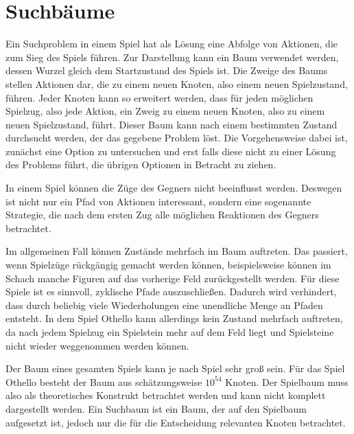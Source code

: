 \section{Suchbäume}

Ein Suchproblem in einem Spiel hat als Lösung eine Abfolge von Aktionen, die zum Sieg des Spiels führen.
Zur Darstellung kann ein Baum verwendet werden, dessen Wurzel gleich dem Startzustand des Spiels ist.
Die Zweige des Baums stellen Aktionen dar, die zu einem neuen Knoten, also einem neuen Spielzustand, führen.
Jeder Knoten kann so erweitert werden, dass für jeden möglichen Spielzug, also jede Aktion, ein Zweig zu einem neuen Knoten, also zu einem neuen Spielzustand, führt.
Dieser Baum kann nach einem bestimmten Zustand durchsucht werden, der das gegebene Problem löst.
Die Vorgehensweise dabei ist, zunächst eine Option zu untersuchen und erst falls diese nicht zu einer Lösung des Problems führt, die übrigen Optionen in Betracht zu ziehen.
\cite[S.~75]{ai2010russel}

In einem Spiel können die Züge des Gegners nicht beeinflusst werden.
Deswegen ist nicht nur ein Pfad von Aktionen interessant, sondern eine sogenannte Strategie, die nach dem ersten Zug alle möglichen Reaktionen des Gegners betrachtet.
\cite[S.~163]{ai2010russel}

Im allgemeinen Fall können Zustände mehrfach im Baum auftreten.
Das passiert, wenn Spielzüge rückgängig gemacht werden können, beispielsweise können im Schach manche Figuren auf das vorherige Feld zurückgestellt werden.
Für diese Spiele ist es sinnvoll, zyklische Pfade auszuschließen. %
Dadurch wird verhindert, dass durch beliebig viele Wiederholungen eine unendliche Menge an Pfaden entsteht.
\cite[S.~75]{ai2010russel}
In dem Spiel Othello kann allerdings kein Zustand mehrfach auftreten, da nach jedem Spielzug ein Spielstein mehr auf dem Feld liegt und Spielsteine nicht wieder weggenommen werden können.

Der Baum eines gesamten Spiels kann je nach Spiel sehr groß sein.
Für das Spiel Othello besteht der Baum aus schätzungsweise $10^{54}$ Knoten. %
Der Spielbaum muss also als theoretisches Konstrukt betrachtet werden und kann nicht komplett dargestellt werden.
Ein Suchbaum ist ein Baum, der auf den Spielbaum aufgesetzt ist, jedoch nur die für die Entscheidung relevanten Knoten betrachtet.
\cite[S.~162f.]{ai2010russel}
